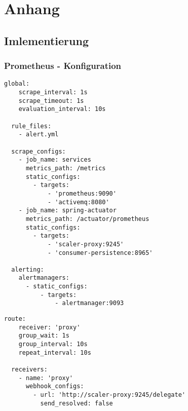 \clearpage
\appendix
\clearpage
\chapter{Anhang}

\section{Imlementierung}

\subsection{Prometheus - Konfiguration}


\begin{lstlisting}[style=bashStyle,caption={Prometheus Konfiguration},label=anh:prometheusYml]
  global:
	scrape_interval: 1s
	scrape_timeout: 1s
	evaluation_interval: 10s
  
  rule_files:
	- alert.yml
  
  scrape_configs:
	- job_name: services
	  metrics_path: /metrics
	  static_configs:
		- targets:
			- 'prometheus:9090'
			- 'activemq:8080'
	- job_name: spring-actuator
	  metrics_path: /actuator/prometheus
	  static_configs:
		- targets:
			- 'scaler-proxy:9245'
			- 'consumer-persistence:8965'
  
  alerting:
	alertmanagers:
	  - static_configs:
		  - targets:
			  - alertmanager:9093
\end{lstlisting}

\begin{lstlisting}[style=bashStyle,caption={Alert Manager - Konfiguration},label=lst:alertManConfig]
  route:
    receiver: 'proxy'
    group_wait: 1s
    group_interval: 10s
    repeat_interval: 10s

  receivers:
    - name: 'proxy'
      webhook_configs:
        - url: 'http://scaler-proxy:9245/delegate'
          send_resolved: false
\end{lstlisting}

